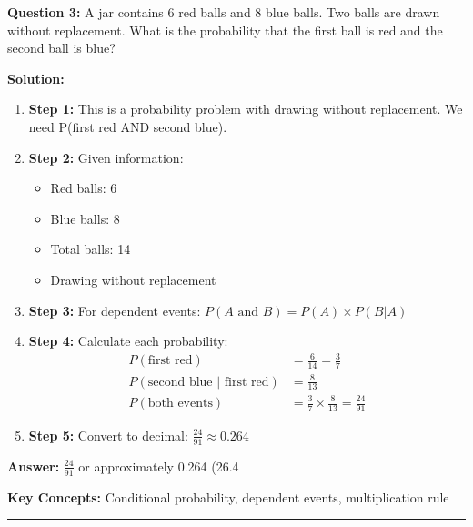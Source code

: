 \textbf{Question 3:} A jar contains 6 red balls and 8 blue balls. Two balls are drawn without replacement. What is the probability that the first ball is red and the second ball is blue?

\textbf{Solution:}
\begin{enumerate}
\item \textbf{Step 1:} This is a probability problem with drawing without replacement. We need P(first red AND second blue).

\item \textbf{Step 2:} Given information:
\begin{itemize}
\item Red balls: 6
\item Blue balls: 8
\item Total balls: 14
\item Drawing without replacement
\end{itemize}

\item \textbf{Step 3:} For dependent events: $P(A \text{ and } B) = P(A) \times P(B|A)$

\item \textbf{Step 4:} Calculate each probability:
\begin{align}
P(\text{first red}) &= \frac{6}{14} = \frac{3}{7} \\
P(\text{second blue | first red}) &= \frac{8}{13} \\
P(\text{both events}) &= \frac{3}{7} \times \frac{8}{13} = \frac{24}{91}
\end{align}

\item \textbf{Step 5:} Convert to decimal: $\frac{24}{91} \approx 0.264$
\end{enumerate}

\textbf{Answer:} $\frac{24}{91}$ or approximately 0.264 (26.4%

\textbf{Key Concepts:} Conditional probability, dependent events, multiplication rule

\hrule
\vspace{1em}

